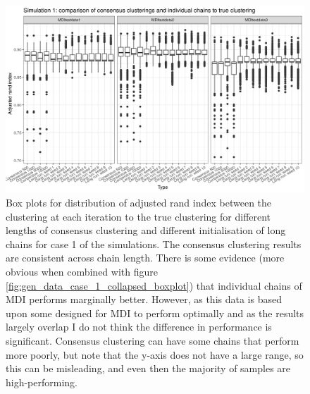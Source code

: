 \documentclass[14pt]{extarticle} %
\begin{document}
		\begin{figure}
			\centering
			\includegraphics[scale=0.9]{Images/Gen_data/Case_1/box_plot_ari_true_clustering_burn_in.png}
			\caption{Box plots for distribution of adjusted rand index between the clustering at each iteration to the true clustering for different lengths of consensus clustering and different initialisation of long chains for case 1 of the simulations. The consensus clustering results are consistent across chain length. There is some evidence (more obvious when combined with figure \ref{fig:gen_data_case_1_collapsed_boxplot}) that individual chains of MDI performs marginally better. However, as this data is based upon some designed for MDI to perform optimally and as the results largely overlap I do not think the difference in performance is significant. Consensus clustering can have some chains that perform more poorly, but note that the y-axis does not have a large range, so this can be misleading, and even then the majority of samples are high-performing.}
			\label{fig:gen_data_case_1_boxplot}
		\end{figure}
		
		
\end{document}
